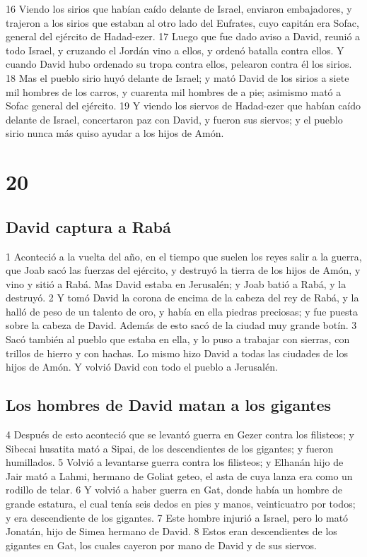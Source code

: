 16 Viendo los sirios que habían caído delante de Israel, enviaron embajadores, y trajeron a los sirios que estaban al otro lado del Eufrates, cuyo capitán era Sofac, general del ejército de Hadad-ezer.
17 Luego que fue dado aviso a David, reunió a todo Israel, y cruzando el Jordán vino a ellos, y ordenó batalla contra ellos. Y cuando David hubo ordenado su tropa contra ellos, pelearon contra él los sirios.
18 Mas el pueblo sirio huyó delante de Israel; y mató David de los sirios a siete mil hombres de los carros, y cuarenta mil hombres de a pie; asimismo mató a Sofac general del ejército.
19 Y viendo los siervos de Hadad-ezer que habían caído delante de Israel, concertaron paz con David, y fueron sus siervos; y el pueblo sirio nunca más quiso ayudar a los hijos de Amón.

\chapter{20}

\section*{David captura a Rabá}

1 Aconteció a la vuelta del año, en el tiempo que suelen los reyes salir a la guerra, que Joab sacó las fuerzas del ejército, y destruyó la tierra de los hijos de Amón, y vino y sitió a Rabá. Mas David estaba en Jerusalén; y Joab batió a Rabá, y la destruyó.
2 Y tomó David la corona de encima de la cabeza del rey de Rabá, y la halló de peso de un talento de oro,  y había en ella piedras preciosas; y fue puesta sobre la cabeza de David. Además de esto sacó de la ciudad muy grande botín.
3 Sacó también al pueblo que estaba en ella, y lo puso a trabajar con sierras, con trillos de hierro y con hachas. Lo mismo hizo David a todas las ciudades de los hijos de Amón. Y volvió David con todo el pueblo a Jerusalén.

\section*{Los hombres de David matan a los gigantes}

4 Después de esto aconteció que se levantó guerra en Gezer contra los filisteos; y Sibecai husatita mató a Sipai, de los descendientes de los gigantes; y fueron humillados.
5 Volvió a levantarse guerra contra los filisteos; y Elhanán hijo de Jair mató a Lahmi, hermano de Goliat geteo, el asta de cuya lanza era como un rodillo de telar. 
6 Y volvió a haber guerra en Gat, donde había un hombre de grande estatura, el cual tenía seis dedos en pies y manos, veinticuatro por todos; y era descendiente de los gigantes.
7 Este hombre injurió a Israel, pero lo mató Jonatán, hijo de Simea hermano de David.
8 Estos eran descendientes de los gigantes en Gat, los cuales cayeron por mano de David y de sus siervos.

